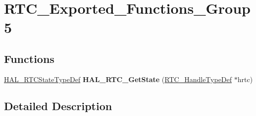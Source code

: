 \hypertarget{group___r_t_c___exported___functions___group5}{}\section{R\+T\+C\+\_\+\+Exported\+\_\+\+Functions\+\_\+\+Group5}
\label{group___r_t_c___exported___functions___group5}
\subsection*{Functions}
\begin{DoxyCompactItemize}
\item 
\mbox{\label{group___r_t_c___exported___functions___group5_ga527ac04240b47a22bf5ff469609eaa4d}} 
\hyperlink{group___r_t_c___exported___types_ga1e2460a2d13c4efc7a2a1ab2a1ebd32b}{H\+A\+L\+\_\+\+R\+T\+C\+State\+Type\+Def} {\bfseries H\+A\+L\+\_\+\+R\+T\+C\+\_\+\+Get\+State} (\hyperlink{struct_r_t_c___handle_type_def}{R\+T\+C\+\_\+\+Handle\+Type\+Def} $\ast$hrtc)
\end{DoxyCompactItemize}


\subsection{Detailed Description}

